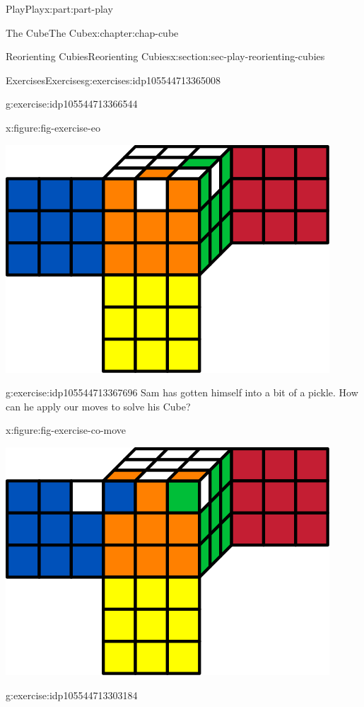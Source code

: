 \documentclass[oneside,10pt,]{book}
\numberwithin{equation}{section}
\begin{document}
\begin{partptx}{Play}{}{Play}{}{}{x:part:part-play}
\begin{chapterptx}{The Cube}{}{The Cube}{}{}{x:chapter:chap-cube}
\begin{sectionptx}{Reorienting Cubies}{}{Reorienting Cubies}{}{}{x:section:sec-play-reorienting-cubies}
\begin{exercises-subsection-numberless}{Exercises}{}{Exercises}{}{}{g:exercises:idp105544713365008}
\begin{divisionexercise}{2}{}{}{g:exercise:idp105544713366544}
\begin{figureptx}{}{x:figure:fig-exercise-eo}{}
\begin{image}{0.25}{0.5}{0.25}
\includegraphics[width=\linewidth]{./images/eo-exer.svg}
\end{image}%
\tcblower
\end{figureptx}%
\end{divisionexercise}%
\begin{divisionexercise}{3}{}{}{g:exercise:idp105544713367696}%
Sam has gotten himself into a bit of a pickle. How can he apply our moves to solve his Cube?%
\begin{figureptx}{}{x:figure:fig-exercise-co-move}{}%
\begin{image}{0.25}{0.5}{0.25}%
\includegraphics[width=\linewidth]{./images/co02.svg}
\end{image}%
\tcblower
\end{figureptx}%
\end{divisionexercise}%
\begin{divisionexercise}{4}{}{}{g:exercise:idp105544713303184}%

\end{divisionexercise}
\end{exercises-subsection-numberless}
\end{sectionptx}
\end{chapterptx}
\end{partptx}
\end{document}
